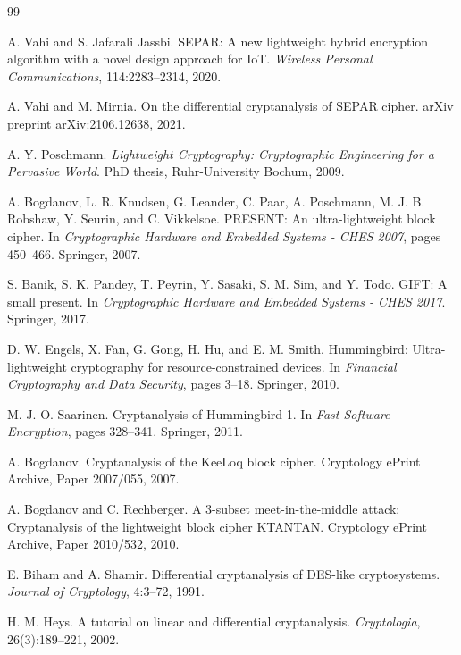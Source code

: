 \documentclass[11pt]{article}
\begin{document}
\begin{thebibliography}{99}

A. Vahi and S. Jafarali Jassbi.
\newblock SEPAR: A new lightweight hybrid encryption algorithm with a novel design approach for IoT.
\newblock \emph{Wireless Personal Communications}, 114:2283--2314, 2020.

A. Vahi and M. Mirnia.
\newblock On the differential cryptanalysis of SEPAR cipher.
\newblock arXiv preprint arXiv:2106.12638, 2021.

A. Y. Poschmann.
\newblock \emph{Lightweight Cryptography: Cryptographic Engineering for a Pervasive World}.
\newblock PhD thesis, Ruhr-University Bochum, 2009.

A. Bogdanov, L. R. Knudsen, G. Leander, C. Paar, A. Poschmann, M. J. B. Robshaw, Y. Seurin, and C. Vikkelsoe.
\newblock PRESENT: An ultra-lightweight block cipher.
\newblock In \emph{Cryptographic Hardware and Embedded Systems - CHES 2007}, pages 450--466. Springer, 2007.

S. Banik, S. K. Pandey, T. Peyrin, Y. Sasaki, S. M. Sim, and Y. Todo.
\newblock GIFT: A small present.
\newblock In \emph{Cryptographic Hardware and Embedded Systems - CHES 2017}. Springer, 2017.

D. W. Engels, X. Fan, G. Gong, H. Hu, and E. M. Smith.
\newblock Hummingbird: Ultra-lightweight cryptography for resource-constrained devices.
\newblock In \emph{Financial Cryptography and Data Security}, pages 3--18. Springer, 2010.

M.-J. O. Saarinen.
\newblock Cryptanalysis of Hummingbird-1.
\newblock In \emph{Fast Software Encryption}, pages 328--341. Springer, 2011.

A. Bogdanov.
\newblock Cryptanalysis of the KeeLoq block cipher.
\newblock Cryptology ePrint Archive, Paper 2007/055, 2007.

A. Bogdanov and C. Rechberger.
\newblock A 3-subset meet-in-the-middle attack: Cryptanalysis of the lightweight block cipher KTANTAN.
\newblock Cryptology ePrint Archive, Paper 2010/532, 2010.

E. Biham and A. Shamir.
\newblock Differential cryptanalysis of DES-like cryptosystems.
\newblock \emph{Journal of Cryptology}, 4:3--72, 1991.

H. M. Heys.
\newblock A tutorial on linear and differential cryptanalysis.
\newblock \emph{Cryptologia}, 26(3):189--221, 2002.


\end{thebibliography}
\end{document}

